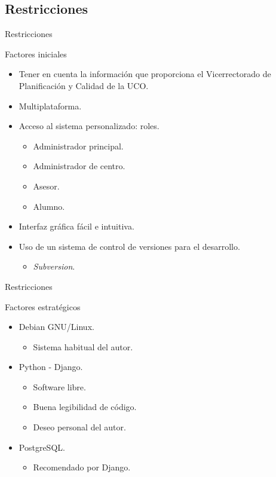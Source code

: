 \documentclass[10pt, hyperref={pdfpagelabels=false}]{beamer}
\begin{document}
    \subsection{Restricciones}
      \begin{frame}{Restricciones}
        \begin{block}{Factores iniciales}
          \begin{itemize}
            \item Tener en cuenta la información que proporciona el
                  Vicerrectorado de Planificación y Calidad de la UCO.
            \item Multiplataforma.
            \item Acceso al sistema personalizado: roles.
            \begin{itemize}
             \item Administrador principal.
             \item Administrador de centro.
             \item Asesor.
             \item Alumno.
            \end{itemize}
            \item Interfaz gráfica fácil e intuitiva.
            \item Uso de un sistema de control de versiones para el desarrollo.
            \begin{itemize}
            \item \textit{Subversion}.
            \end{itemize}
          \end{itemize}
        \end{block}
      \end{frame}

      \begin{frame}{Restricciones}
        \begin{block}{Factores estratégicos}
          \begin{itemize}
           \item Debian GNU/Linux.
           \begin{itemize}
            \item Sistema habitual del autor.
           \end{itemize}
           \item Python - Django.
           \begin{itemize}
            \item Software libre.
            \item Buena legibilidad de código.
            \item Deseo personal del autor.
           \end{itemize}
           \item PostgreSQL.
           \begin{itemize}
            \item Recomendado por Django.
           \end{itemize}
          \end{itemize}
        \end{block}
      \end{frame}
\end{document}
